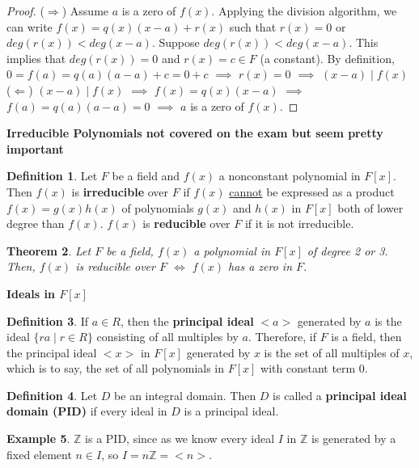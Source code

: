 \documentclass[11pt]{article}
\newtheorem{thm}{Theorem}[section]
\theoremstyle{definition}
\newtheorem{definition}[thm]{Definition}
\newtheorem{example}[thm]{Example}
\numberwithin{equation}{section}
\newcommand{\Z}{\mathbb{Z}}
\begin{document}
\begin{proof}
($\Rightarrow$) Assume $a$ is a zero of $f(x)$. Applying the division algorithm, we can write $f(x) = q(x)(x-a)+r(x)$ such that $r(x) = 0$ or $deg(r(x))<deg(x-a)$. Suppose $deg(r(x))<deg(x-a)$. This implies that $deg(r(x)) = 0$ and $r(x) = c \in F$ (a constant). By definition, $0 = f(a) = q(a)(a-a) +c = 0+c$ $\implies$ $r(x) = 0$ $\implies$ $(x-a) \mid f(x)$\\
($\Leftarrow$) $(x-a) \mid f(x)$ $\implies$ $f(x) = q(x)(x-a)$ $\implies$ $f(a) = q(a)(a-a) = 0$ $\implies$ $a$ is a zero of $f(x)$.
\end{proof}

\textbf{Irreducible Polynomials not covered on the exam but seem pretty important}

\begin{definition}
Let $F$ be a field and $f(x)$ a nonconstant polynomial in $F[x]$. Then $f(x)$ is \textbf{irreducible} over $F$ if $f(x)$ \underline{cannot} be expressed as a product $f(x) = g(x)h(x)$ of polynomials $g(x)$ and $h(x)$ in $F[x]$ both of lower degree than $f(x)$. $f(x)$ is \textbf{reducible} over $F$ if it is not irreducible.
\end{definition}

\begin{thm}
Let $F$ be a field, $f(x)$ a polynomial in $F[x]$ of degree 2 or 3. Then, $f(x)$ is reducible over $F$ $\Longleftrightarrow$ $f(x)$ has a zero in $F$.
\end{thm}

\textbf{Ideals in $F[x]$}

\begin{definition}
If $a \in R$, then the \textbf{principal ideal} $<a>$ generated by $a$ is the ideal $\{ra \mid r \in R\}$ consisting of all multiples by $a$. Therefore, if $F$ is a field, then the principal ideal $<x>$ in $F[x]$ generated by $x$ is the set of all multiples of $x$, which is to say, the set of all polynomials in $F[x]$ with constant term 0.
\end{definition}

\begin{definition}
Let $D$ be an integral domain. Then $D$ is called a \textbf{principal ideal domain (PID)} if every ideal in $D$ is a principal ideal.
\end{definition}

\begin{example}
$\Z$ is a PID, since as we know every ideal $I$ in $\Z$ is generated by a fixed element $n \in I$, so $I=n\Z=<n>$.
\end{example}
\end{document}
